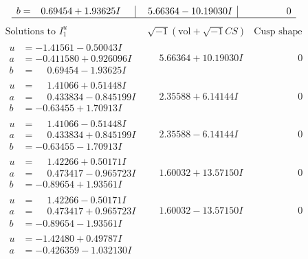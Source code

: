 \documentclass[1p]{elsarticle_modified}
\theoremstyle{definition}
\newcommand{\I}{\sqrt{-1}}
\begin{document}
$$\begin{array}{c|c|c}
\begin{aligned}
b &= \phantom{-}0.69454 + 1.93625 I\end{aligned}
 & \phantom{-}5.66364 - 10.19030 I & \phantom{-0.000000 } 0\\
 \hline 
 \end{array}$$\newpage$$\begin{array}{c|c|c}  
\text{Solutions to }I^u_{1}& \I (\text{vol} + \sqrt{-1}CS) & \text{Cusp shape}\\
 \hline 
\begin{aligned}
u &= -1.41561 - 0.50043 I \\
a &= -0.411580 + 0.926096 I \\
b &= \phantom{-}0.69454 - 1.93625 I\end{aligned}
 & \phantom{-}5.66364 + 10.19030 I & \phantom{-0.000000 } 0 \\ \hline\begin{aligned}
u &= \phantom{-}1.41066 + 0.51448 I \\
a &= \phantom{-}0.433834 - 0.845199 I \\
b &= -0.63455 + 1.70913 I\end{aligned}
 & \phantom{-}2.35588 + 6.14144 I & \phantom{-0.000000 } 0 \\ \hline\begin{aligned}
u &= \phantom{-}1.41066 - 0.51448 I \\
a &= \phantom{-}0.433834 + 0.845199 I \\
b &= -0.63455 - 1.70913 I\end{aligned}
 & \phantom{-}2.35588 - 6.14144 I & \phantom{-0.000000 } 0 \\ \hline\begin{aligned}
u &= \phantom{-}1.42266 + 0.50171 I \\
a &= \phantom{-}0.473417 - 0.965723 I \\
b &= -0.89654 + 1.93561 I\end{aligned}
 & \phantom{-}1.60032 + 13.57150 I & \phantom{-0.000000 } 0 \\ \hline\begin{aligned}
u &= \phantom{-}1.42266 - 0.50171 I \\
a &= \phantom{-}0.473417 + 0.965723 I \\
b &= -0.89654 - 1.93561 I\end{aligned}
 & \phantom{-}1.60032 - 13.57150 I & \phantom{-0.000000 } 0 \\ \hline\begin{aligned}
u &= -1.42480 + 0.49787 I \\
a &= -0.426359 - 1.032130 I \\

\end{aligned}
\end{array}$$
\end{document}

